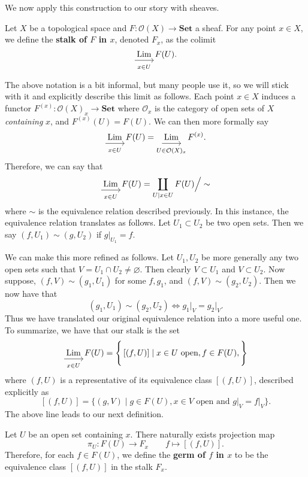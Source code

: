 We now apply this construction to our story with sheaves. 
\begin{definition}
    Let $X$ be a topological 
    space and $F: \mathcal{O}(X) \to \textbf{Set}$ a sheaf. For any point $x \in X$, 
    we define the \textbf{stalk of $F$ in $x$}, denoted $F_x$, 
    as the colimit 
    \[
        \Limto_{x \in U} F(U).
    \]
\end{definition}
The above notation is a bit informal, but many people use it, so we 
will stick with it and explicitly
describe this limit as follows. Each point $x \in X$ 
induces a functor $F^{(x)}: \mathcal{O}(X)_x \to \textbf{Set}$ where 
$\mathcal{O}_x$ is the category of open sets of $X$ \emph{containing} $x$, 
and $F^{(x)}(U) = F(U)$. We can then more formally say 
\[
    \Limto_{x \in U} F(U) =  \Limto_{U \in \mathcal{O}(X)_x}F^{(x)}.
\]
Therefore, we can say that 
\[
    \Limto_{x \in U} F(U) = \coprod_{U \mid x \in U}  F(U)\Big/\sim
\]
where $\sim$ is the equivalence relation described previously. In this instance, the equivalence relation translates 
as follows. Let $U_1 \subset U_2$ be two open sets. Then we say 
$(f, U_1) \sim (g, U_2)$ if $g\Big|_{U_1} = f$. 

We can make this more refined as follows. Let $U_1, U_2$ be more generally 
any two open sets such that $V = U_1 \cap U_2 \ne \varnothing$. 
Then clearly $V \subset U_1$ and $V \subset U_2$. 
Now suppose, $(f, V) \sim (g_1, U_1)$ for some $f, g_1$, and 
$(f, V) \sim (g_2, U_2)$. Then we now have that 
\[
    (g_1, U_1) \sim (g_2, U_2) \iff g_1\Big|_{V} = g_2\Big|_{V}. 
\]
Thus we have translated our original equivalence relation into a more 
useful one. To summarize, we have that our stalk is the set
\[
    \Limto_{x \in U} F(U) = \Bigg\{ \,[(f, U)] \mid x \in U \text{ open}, f \in F(U), \Bigg\}
\] 
where $(f, U)$ is a representative of its equivalence class $[(f, U)]$, 
described explicitly as
\[
    [(f, U)] = \Big\{ (g, V) \mid g \in F(U), x \in V \text{ open} \text{ and } g\Big|_{V} = f\Big|_{V}  \Big\}.
\]
The above line leads to our next definition. 

\begin{definition}
    Let $U$ be an open set containing $x$. There naturally exists projection map 
    \[
        \pi_U: F(U) \to F_x \qquad f \mapsto [(f, U)].
    \]
    Therefore, for each $f \in F(U)$, we define  
    the \textbf{germ of $f$ in $x$} to be the equivalence class 
    $[(f, U)]$ in the stalk $F_x$. 
\end{definition}

